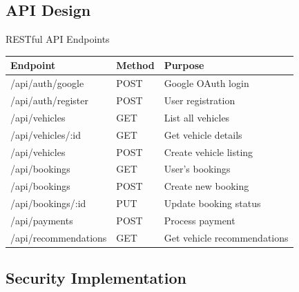 \subsection{API Design}

\begin{frame}{RESTful API Endpoints}
\begin{table}
\scriptsize
\begin{tabular}{|l|l|l|}
\hline
\textbf{Endpoint} & \textbf{Method} & \textbf{Purpose} \\
\hline
/api/auth/google & POST & Google OAuth login \\
/api/auth/register & POST & User registration \\
/api/vehicles & GET & List all vehicles \\
/api/vehicles/:id & GET & Get vehicle details \\
/api/vehicles & POST & Create vehicle listing \\
/api/bookings & GET & User's bookings \\
/api/bookings & POST & Create new booking \\
/api/bookings/:id & PUT & Update booking status \\
/api/payments & POST & Process payment \\
/api/recommendations & GET & Get vehicle recommendations \\
\hline
\end{tabular}
\end{table}
\end{frame}

\subsection{Security Implementation}

